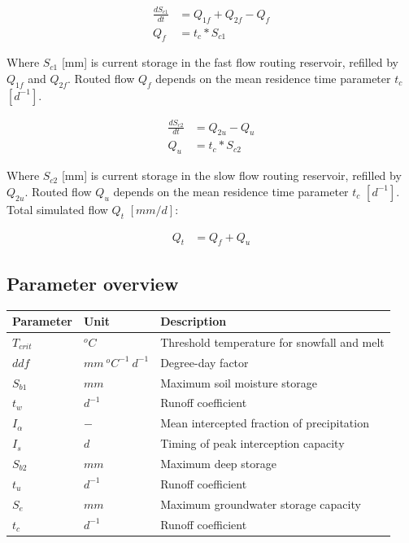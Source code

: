 \begin{align}
	\frac{dS_{c1}}{dt} &= Q_{1f}+Q_{2f}-Q_{f}\\
	Q_f &= t_c*S_{c1}
\end{align}

Where $S_{c1}$ [mm] is current storage in the fast flow routing reservoir, refilled by $Q_{1f}$ and $Q_{2f}$. Routed flow $Q_f$ depends on the mean residence time parameter $t_c$ $[d^{-1}]$.

\begin{align}
	\frac{dS_{c2}}{dt} &= Q_{2u}-Q_{u}\\
	Q_u &= t_c*S_{c2}
\end{align}

Where $S_{c2}$ [mm] is current storage in the slow flow routing reservoir, refilled by $Q_{2u}$. Routed flow $Q_u$ depends on the mean residence time parameter $t_c$ $[d^{-1}]$. Total simulated flow $Q_t$ $[mm/d]$:

\begin{align}
	Q_t &= Q_f + Q_u
\end{align}

\subsection{Parameter overview}
\begin{table}[htbp]
  \centering
    \begin{tabular}{lll}
    \toprule
    Parameter & Unit  & Description \\
    \midrule
    $T_{crit}$ & $^oC$ & Threshold temperature for snowfall and melt \\
    $ddf$ & $mm~^oC^{-1}~d^{-1}$ & Degree-day factor \\
    $S_{b1}$ & $mm$  & Maximum soil moisture storage \\
    $t_w$ & $d^{-1}$ & Runoff coefficient \\
    $I_{\alpha}$ & $-$   & Mean intercepted fraction of precipitation \\
    $I_{s}$ & $d$   & Timing of peak interception capacity \\
    $S_{b2}$ & $mm$  & Maximum deep storage \\
    $t_u$ & $d^{-1}$ & Runoff coefficient \\
    $S_e$ & $mm$  & Maximum groundwater storage capacity \\
    $t_c$ & $d^{-1}$ & Runoff coefficient \\
    \bottomrule
    \end{tabular}%
  \label{tab:addlabel}%
\end{table}%
